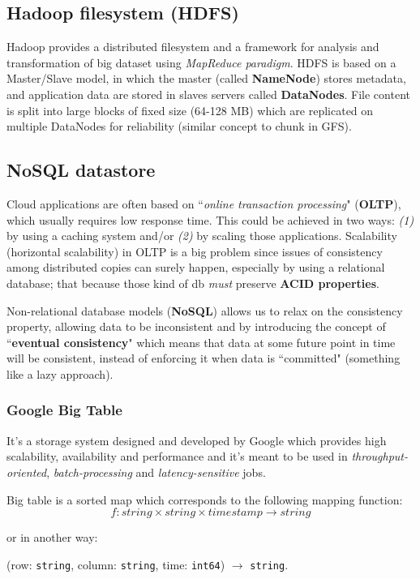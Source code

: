 \documentclass{article}
\begin{document}
\subsection{Hadoop filesystem (HDFS)}
Hadoop provides a distributed filesystem and a framework for analysis and transformation of big dataset using \textit{MapReduce paradigm}. HDFS is based on a Master/Slave model, in which the master (called \textbf{NameNode}) stores metadata, and application data are stored in slaves servers called \textbf{DataNodes}. File content is split into large blocks of fixed size (64-128 MB) which are replicated on multiple DataNodes for reliability (similar concept to chunk in GFS).

\subsection{NoSQL datastore}
Cloud applications are often based on ``\textit{online transaction processing}" (\textbf{OLTP}), which usually requires low response time. This could be achieved in two ways: \textit{(1)} by using a caching system and/or \textit{(2)} by scaling those applications. Scalability (horizontal scalability) in OLTP is a big problem since issues of consistency among distributed copies can surely happen, especially by using a relational database; that because those kind of db \textit{must} preserve \textbf{ACID properties}.

\bigskip
Non-relational database models (\textbf{NoSQL}) allows us to relax on the consistency property, allowing data to be inconsistent and by introducing the concept of ``\textbf{eventual consistency}" which means that data at some future point in time will be consistent, instead of enforcing it when data is ``committed" (something like a lazy approach).

\subsubsection{Google Big Table}
It's a storage system designed and developed by Google which provides high scalability, availability and performance and it's meant to be used in \textit{throughput-oriented}, \textit{batch-processing} and \textit{latency-sensitive} jobs.

Big table is a sorted map which corresponds to the following mapping function:
$$ f : string \times string \times timestamp \rightarrow string $$

or in another way: 

\bigskip 
(row: \texttt{string}, column: \texttt{string}, time: \texttt{int64}) $\rightarrow$ \texttt{string}.
\end{document}
